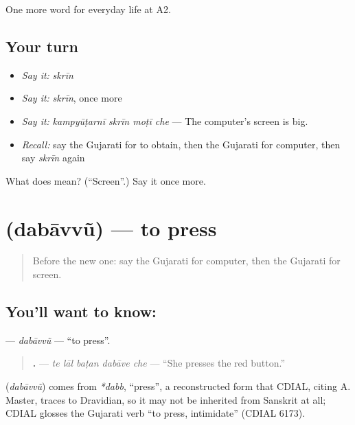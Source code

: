 \begin{grammarlens}[title={What you've built}]
One more word for everyday life at A2.
\end{grammarlens}

\subsection*{Your turn}
\begin{itemize}
\raggedright
  \item \emph{Say it:} \emph{skrīn}
  \item \emph{Say it:} \emph{skrīn}, once more
  \item \emph{Say it:} \emph{kampyūṭarnī skrīn moṭī che} — The computer's screen is big.
  \item \emph{Recall:} say the Gujarati for to obtain, then the Gujarati for computer, then say \emph{skrīn} again
\end{itemize}

\begin{tcolorbox}[breakable,colback=teal!4,colframe=teal!35!black,title={Before you move on}]
What does  mean? (\textquotedblleft{}Screen\textquotedblright{}.) Say it once more.
\end{tcolorbox}
\section[\texorpdfstring{\gu{દબાવવું} (dabāvvũ)}{દબાવવું (dabāvvũ)}]{ (dabāvvũ) — to press}

\label{lesson:GU-C250-dabavvu}



\begin{quote}
Before the new one: say the Gujarati for computer, then the Gujarati for screen.
\end{quote}

\subsection*{You'll want to know: }
\textbf{} — \emph{dabāvvũ} — \textquotedblleft{}to press\textquotedblright{}.

\begin{quote}
\textbf{    .} — \emph{te lāl baṭan dabāve che} — \textquotedblleft{}She presses the red button.\textquotedblright{}
\end{quote}

\begin{cousinweb}
\textbf{} (\emph{dabāvvũ}) comes from \emph{*dabb}, \textquotedblleft{}press\textquotedblright{}, a reconstructed form that CDIAL, citing A. Master, traces to Dravidian, so it may not be inherited from Sanskrit at all; CDIAL glosses the Gujarati verb \textquotedblleft{}to press, intimidate\textquotedblright{} (CDIAL 6173).
\end{cousinweb}

